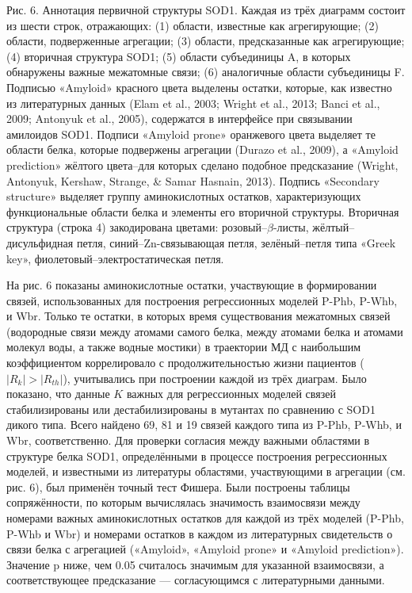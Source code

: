 Рис. 6. Аннотация первичной структуры SOD1. Каждая из трёх диаграмм состоит из шести строк, отражающих: (1) области, известные как агрегирующие; (2) области, подверженные агрегации; (3) области, предсказанные как агрегирующие; (4) вторичная структура SOD1; (5) области субъединицы A, в которых обнаружены важные межатомные связи; (6) аналогичные области субъединицы F. Подписью «Amyloid» красного цвета выделены остатки, которые, как известно из литературных данных (Elam et al., 2003; Wright et al., 2013; Banci et al., 2009; Antonyuk et al., 2005), содержатся в интерфейсе при связывании амилоидов SOD1. Подписи «Amyloid prone» оранжевого цвета выделяет те области белка, которые подвержены агрегации (Durazo et al., 2009), а «Amyloid prediction» жёлтого цвета--для которых сделано подобное предсказание (Wright, Antonyuk, Kershaw, Strange, \& Samar Hasnain, 2013). Подпись «Secondary structure» выделяет группу аминокислотных остатков, характеризующих функциональные области белка и элементы его вторичной структуры. Вторичная структура (строка 4) закодирована цветами: розовый--$\beta$-листы, жёлтый--дисульфидная петля, синий--Zn-связывающая петля, зелёный--петля типа «Greek key», фиолетовый--электростатическая петля.

На рис. 6 показаны аминокислотные остатки, участвующие в формировании связей, использованных для построения регрессионных моделей P-Phb, P-Whb, и Wbr. Только те остатки, в которых время существования межатомных связей (водородные связи между атомами самого белка, между атомами белка и атомами молекул воды, а также водные мостики) в траектории МД с наибольшим коэффициентом коррелировало с продолжительностью жизни пациентов ($|R_k| > |R_{th}|$), учитывались при построении каждой из трёх диаграм. Было показано, что данные $K$ важных для регрессионных моделей связей стабилизированы или дестабилизированы в мутантах по сравнению с SOD1 дикого типа. Всего найдено 69, 81 и 19 связей каждого типа из P-Phb, P-Whb, и Wbr, соответственно.
Для проверки согласия между важными областями в структуре белка SOD1, определёнными в процессе построения регрессионных моделей, и известными из литературы областями, участвующими в агрегации (см. рис. 6), был применён точный тест Фишера. Были построены таблицы сопряжённости, по которым вычислялась значимость взаимосвязи между номерами важных аминокислотных остатков для каждой из трёх моделей (P-Phb, P-Whb и Wbr) и номерами остатков в каждом из литературных свидетельств о связи белка с агрегацией («Amyloid», «Amyloid prone» и «Amyloid prediction»). Значение p ниже, чем 0.05 считалось значимым для указанной взаимосвязи, а соответствующее предсказание — согласующимся с литературными данными. 

